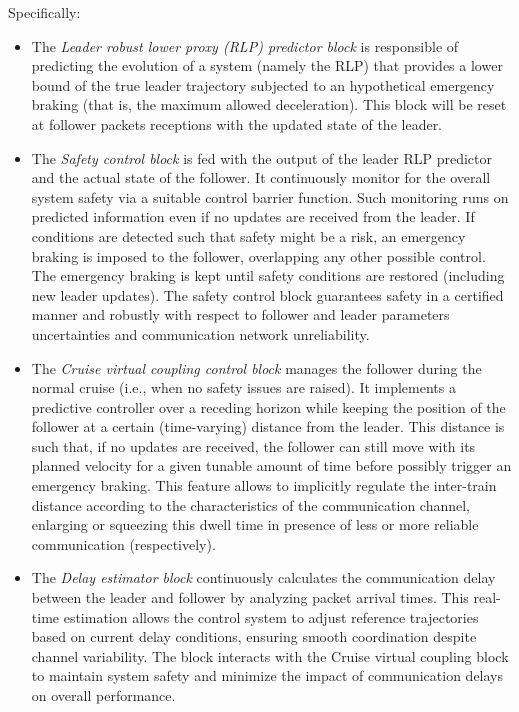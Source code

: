 \documentclass[letterpaper, 10 pt, conference]{ieeeconf}
\theoremstyle{definition}
\theoremstyle{nopoint}
\begin{document}
Specifically:
\begin{itemize}
\item The {\em Leader robust lower proxy (RLP) predictor block} is responsible of predicting the evolution of a system (namely the RLP) that provides a lower bound of the true leader trajectory subjected to an hypothetical emergency braking (that is, the maximum allowed deceleration). 
This block will be reset at follower packets receptions with the updated state of the leader. 
\item The {\em Safety control block} is fed with the output of the leader RLP predictor and the actual state of the follower. It continuously monitor for the overall system safety via a suitable control barrier function. Such monitoring runs on predicted information even if no updates are received from the leader. If conditions are detected such that safety might be a risk, an emergency braking is imposed to the follower, overlapping any other possible control. The emergency braking is kept until safety conditions are restored (including new leader updates). The safety control block guarantees safety in a certified manner and robustly with respect to follower and leader parameters uncertainties and communication network unreliability. 
\item The {\em Cruise virtual coupling control block} manages the follower during the normal cruise (i.e., when no safety issues are raised). It implements a predictive controller over a receding horizon while keeping the position of the follower at a certain (time-varying) distance from the leader. This distance is such that, if no updates are received, the follower can still move with its planned velocity for a given tunable amount of time before possibly trigger an emergency braking. 
This feature allows to implicitly regulate the inter-train distance according to the characteristics of the communication channel, enlarging or squeezing this dwell time in presence of less or more reliable communication (respectively). 

\item The {\em  Delay estimator block} continuously calculates the communication delay between the leader and follower by analyzing packet arrival times. This real-time estimation allows the control system to adjust reference trajectories based on current delay conditions, ensuring smooth coordination despite channel variability. The block interacts with the Cruise virtual coupling block to maintain system safety and minimize the impact of communication delays on overall performance.
\end{itemize} 
\end{document}
